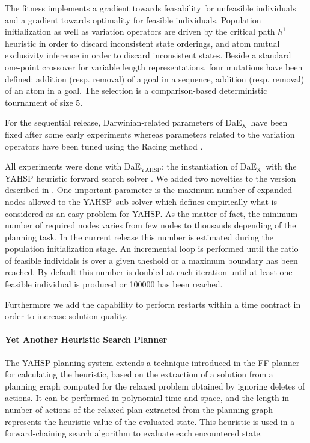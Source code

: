 \documentclass{sig-alternate}
\newcommand{\DAEX}{{\sc DaE$_{\text{X}}$}}
\newcommand{\DAEYAHSP}{{\sc DaE$_{\text{YAHSP}}$}}
\newcommand{\YAHSP}{{\sc YAHSP}}
\begin{document}
The fitness implements a gradient towards feasability for unfeasible individuals and a gradient towards optimality for feasible individuals.
Population initialization as well as variation operators are driven by the critical path $h^1$ heuristic \cite{h1:aips2000} in order to discard inconsistent state orderings, and atom mutual exclusivity inference in order to discard inconsistent states.
Beside a standard one-point crossover for variable length representations, four mutations have been defined: addition (resp. removal) of a goal in a sequence, addition (resp. removal) of an atom in a goal.
The selection is a comparison-based deterministic tournament of size 5.

For the sequential release, Darwinian-related parameters of \DAEX\ have been fixed after some early experiments \cite{dae:evocop2006} whereas 
parameters related to the variation operators have been tuned using the Racing method \cite{dae:gecco2010}.

All experiments were done with \DAEYAHSP: the instantiation of \DAEX\ with the YAHSP heuristic forward search solver \cite{yahsp:icaps2004}. %
We added two novelties to the version described in \cite{dae:icaps2010}. 
One important parameter is the maximum number of expanded nodes allowed to the \YAHSP\ sub-solver which defines empirically what is considered as an easy problem for \YAHSP. As the matter of fact, the minimum number of required nodes varies from few nodes to thousands depending of the planning task. 
In the current release this number is estimated during the population initialization stage. An incremental loop is performed until the ratio of feasible individals is over a given theshold or a maximum boundary has been reached. By default this number is doubled at each iteration until at least one feasible individual is produced or 100000 has been reached.

Furthermore we add the capability to perform restarts within a time contract in order to increase solution quality.

\paragraph{Yet Another Heuristic Search Planner} %

The YAHSP planning system 
\cite{yahsp:icaps2004}  extends  a  technique   introduced  in  the  FF  planner
\cite{ff:jair01}  for calculating  the  heuristic, based  on  the extraction  of
a solution  from a planning graph  computed for the relaxed  problem obtained by
ignoring deletes of actions.  It can  be performed in polynomial time and space,
and  the length in  number of  actions of  the relaxed  plan extracted  from the
planning  graph represents  the heuristic  value of  the evaluated  state.  This
heuristic  is used  in  a  forward-chaining search  algorithm  to evaluate  each
encountered state.
\end{document}

